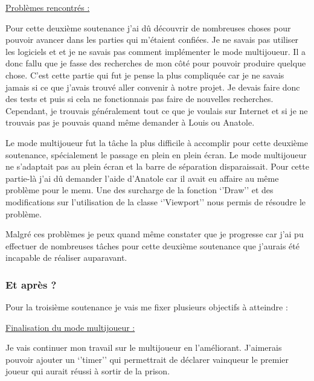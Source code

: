 \documentclass{article}
\begin{document}
\newpage
\underline{Problèmes rencontrés :}
\newline

\par
Pour cette deuxième soutenance j’ai dû découvrir de nombreuses choses pour pouvoir avancer dans les parties qui m’étaient confiées. Je ne savais pas utiliser les logiciels  et  et je ne savais pas comment implémenter le mode multijoueur. Il a donc fallu que je fasse des recherches de mon côté pour pouvoir produire quelque chose. C’est cette partie qui fut je pense la plus compliquée car je ne savais jamais si ce que j’avais trouvé aller convenir à notre projet. Je devais faire donc des tests et puis si cela ne fonctionnais pas faire de nouvelles recherches. Cependant, je trouvais généralement tout ce que je voulais sur Internet et si je ne trouvais pas je pouvais quand même demander à Louis ou Anatole. 

\par
Le mode multijoueur fut la tâche la plus difficile à accomplir pour cette deuxième soutenance, spécialement le passage en plein en plein écran. Le mode multijoueur ne s’adaptait pas au plein écran et la barre de séparation disparaissait. Pour cette partie-là j’ai dû demander l’aide d’Anatole car il avait eu affaire au même problème pour le menu. Une des surcharge de la fonction ‘’Draw’’ et des modifications sur l’utilisation de la classe ‘’Viewport’’ nous permis de résoudre le problème.

\par
Malgré ces problèmes je peux quand même constater que je progresse car j’ai pu effectuer de nombreuses tâches pour cette deuxième soutenance que j’aurais été incapable de réaliser auparavant.
\newline
  
\subsubsection{Et après ?}

Pour la troisième soutenance je vais me fixer plusieurs objectifs à atteindre :
\newline

\underline{Finalisation du mode multijoueur :}
\newline
\par
Je vais continuer mon travail sur le multijoueur en l'améliorant. J’aimerais pouvoir ajouter un ‘’timer’’ qui permettrait de déclarer vainqueur le premier joueur qui aurait réussi à sortir de la prison.  
\newline
\end{document}
